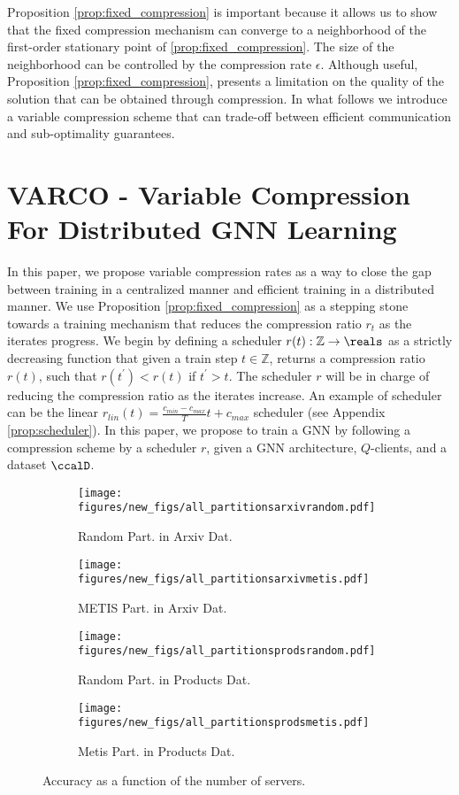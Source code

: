 \documentclass[lettersize,journal]{IEEEtran}
\begin{document}
Proposition \ref{prop:fixed_compression} is important because it allows us to show that the fixed compression mechanism can converge to a neighborhood of the first-order stationary point of \ref{prop:fixed_compression}. The size of the neighborhood can be controlled by the compression rate $\epsilon$.
Although useful, Proposition \ref{prop:fixed_compression}, presents a limitation on the quality of the solution that can be obtained through compression. In what follows we introduce a variable compression scheme that can trade-off between efficient communication and sub-optimality guarantees. 

\section{VARCO - Variable Compression For Distributed GNN Learning}
In this paper, we propose variable compression rates as a way to close the gap between training in a centralized manner and efficient training in a distributed manner. We use Proposition \eqref{prop:fixed_compression} as a stepping stone towards a training mechanism that reduces the compression ratio $r_t$ as the iterates progress. We begin by defining a scheduler $r(t):\mathbb{Z}\to \reals$ as a strictly decreasing function that given a train step $t\in \mathbb{Z}$, returns a compression ratio $r(t)$, such that $r(t^{'})< r(t)$ if $t^{'}> t$. 
The scheduler $r$ will be in charge of reducing the compression ratio as the iterates increase. An example of scheduler can be the linear $r_{lin}(t)=\frac{c_{min}-c_{max}}{T} t + c_{max}$ scheduler (see Appendix \ref{prop:scheduler}).
In this paper, we propose to train a GNN by following a compression scheme by a scheduler $r$, given a GNN architecture, $Q$-clients, and a dataset $\ccalD$. 
%
%

\begin{figure*}
	\begin{subfigure}{0.24\textwidth}
		\centering
		\texttt{[image: figures/new\_figs/all\_partitionsarxivrandom.pdf]}
		\caption{Random Part. in Arxiv Dat.}
		\label{subfig:ServerRandomArxiv}
	\end{subfigure}
	\begin{subfigure}{0.24\textwidth}
		\centering
		\texttt{[image: figures/new\_figs/all\_partitionsarxivmetis.pdf]}
		\caption{METIS Part. in Arxiv Dat.}
		\label{subfig:ServerMetisArxiv}
	\end{subfigure}
	\begin{subfigure}{0.24\textwidth}
		\centering
		\texttt{[image: figures/new\_figs/all\_partitionsprodsrandom.pdf]}
		\caption{Random Part. in Products Dat.}
		\label{subfig:ServerRandomProds}
	\end{subfigure}
         \begin{subfigure}{0.24\textwidth}
		\centering
		\texttt{[image: figures/new\_figs/all\_partitionsprodsmetis.pdf]}
		\caption{Metis Part. in Products Dat.}
		\label{subfig:ServerMetisProds}
	\end{subfigure}
	\caption{Accuracy as a function of the number of servers.}
	\label{fig:servers}
\end{figure*}
\end{document}
